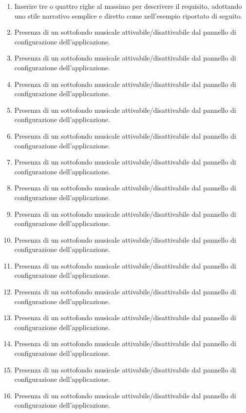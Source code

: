 \documentclass[12pt,a4paper]{report}
\begin{document}
\begin{enumerate}
  \item Inserire tre o quattro righe al massimo per descrivere il requisito, adottando uno stile narrativo semplice e diretto come nell'esempio riportato di seguito.
  \item Presenza di un sottofondo musicale attivabile/disattivabile dal pannello di configurazione dell'applicazione.
  \item Presenza di un sottofondo musicale attivabile/disattivabile dal pannello di configurazione dell'applicazione.
  \item Presenza di un sottofondo musicale attivabile/disattivabile dal pannello di configurazione dell'applicazione.
  \item Presenza di un sottofondo musicale attivabile/disattivabile dal pannello di configurazione dell'applicazione.
  \item Presenza di un sottofondo musicale attivabile/disattivabile dal pannello di configurazione dell'applicazione.
  \item Presenza di un sottofondo musicale attivabile/disattivabile dal pannello di configurazione dell'applicazione.
  \item Presenza di un sottofondo musicale attivabile/disattivabile dal pannello di configurazione dell'applicazione.
  \item Presenza di un sottofondo musicale attivabile/disattivabile dal pannello di configurazione dell'applicazione.
  \item Presenza di un sottofondo musicale attivabile/disattivabile dal pannello di configurazione dell'applicazione.
  \item Presenza di un sottofondo musicale attivabile/disattivabile dal pannello di configurazione dell'applicazione.
  \item Presenza di un sottofondo musicale attivabile/disattivabile dal pannello di configurazione dell'applicazione.
  \item Presenza di un sottofondo musicale attivabile/disattivabile dal pannello di configurazione dell'applicazione.
  \item Presenza di un sottofondo musicale attivabile/disattivabile dal pannello di configurazione dell'applicazione.
  \item Presenza di un sottofondo musicale attivabile/disattivabile dal pannello di configurazione dell'applicazione.
  \item Presenza di un sottofondo musicale attivabile/disattivabile dal pannello di configurazione dell'applicazione.

\end{enumerate}
\end{document}
